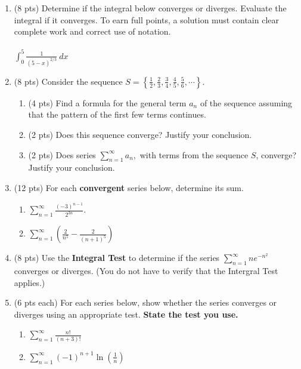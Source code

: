 \documentclass[12pt]{article}
\let\ds\displaystyle
\begin{document}
\newpage
\begin{enumerate}
\item (8 pts) Determine if the integral below converges or diverges. Evaluate the integral if it converges. To earn full points, a solution must contain clear complete work and correct use of notation. \\
\quad \\
$\ds \int_0^5 \frac{1}{(5-x)^{2/3}} \: dx$

\vfill

\vfill

\item (8 pts) Consider the sequence $S=\left\{\frac{1}{2},\frac{2}{3},\frac{3}{4}, \frac{4}{5}, \frac{5}{6},\cdots \right\}.$
	\begin{enumerate}
	\item (4 pts) Find a formula for the general term $a_n$ of the sequence assuming that the pattern of the first few terms continues.
	\vfill
	\item (2 pts) Does this sequence converge? Justify your conclusion.
	\vfill
	\item (2 pts) Does series $\ds \sum_{n=1}^\infty a_n,$ with terms from the sequence $S$, converge? Justify your conclusion.
	\vfill
	\end{enumerate}
\newpage
\item (12 pts) For each \textbf{convergent} series below, determine its sum.  
	\begin{enumerate}
	\item $\ds \sum_{n=1}^\infty \frac{(-3)^{n-1}}{2^{3n}}.$
	\vfill
	\item $\ds \sum_{n=1}^{\infty} \left( \frac{2}{n^5}-\frac{2}{(n+1)^5}\right)$
	\vfill
	\end{enumerate}
\newpage
\item (8 pts) Use the \textbf{Integral Test} to determine if the series $\ds \sum_{n=1}^{\infty} ne^{-n^2}$ converges or diverges. (You do not have to verify that the Intergral Test applies.)

\vfill

\item (6 pts each) For each series below, show whether the series converges or diverges using an appropriate test. \textbf{State the test you use.}

	\begin{enumerate}
	\item $\ds \sum_{n=1}^{\infty} \frac{n!}{(n+3)!} $

	\vfill
\newpage
	\item $\ds \sum_{n=1}^{\infty} (-1)^{n+1}\ln\left(\tfrac{1}{n}\right)$ 


\end{enumerate}
\end{enumerate}
\end{document}
